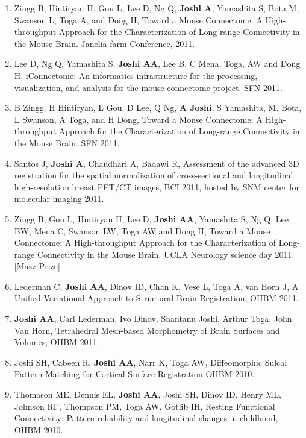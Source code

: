 \documentclass[overlapped,line,letterpaper]{res}
\begin{document}
\begin{resume}
\begin{enumerate}
    \item Zingg B, Hintiryan H, Gou L, Lee D, Ng Q, \textbf{Joshi A}, Yamashita S, Bota M, Swanson L, Toga A, and Dong H, {Toward a Mouse Connectome: A High-throughput Approach for the Characterization of Long-range Connectivity in the Mouse Brain}. Janelia farm Conference, 2011.

    \item Lee D, Ng Q, Yamashita S, \textbf{Joshi AA}, Lee B, C Mena, Toga, AW and Dong H, {iConnectome: An informatics infrastructure for the processing, visualization, and analysis for the mouse connectome project}. SFN 2011.

    \item B Zingg, H Hintiryan, L Gou, D Lee, Q Ng, \textbf{A Joshi}, S Yamashita, M. Bota, L Swanson, A Toga, and H Dong, {Toward a Mouse Connectome: A High-throughput Approach for the Characterization of Long-range Connectivity in the Mouse Brain}. SFN 2011.

    \item Santos J, \textbf{Joshi A}, Chaudhari A, Badawi R, {Assessment of the advanced 3D registration for the spatial normalization of cross-sectional and longitudinal high-resolution breast PET/CT images}, BCI 2011, hosted by SNM center for molecular imaging  2011.

    \item Zingg B, Gou L, Hintiryan H, Lee D, \textbf{Joshi AA}, Yamashita S, Ng Q, Lee BW, Mena C, Swanson LW, Toga AW and Dong H, {Toward a Mouse Connectome: A High-throughput Approach for the Characterization of Long-range Connectivity in the Mouse Brain}. UCLA Neurology science day 2011. [Mazz Prize]

    \item Lederman C, \textbf{Joshi AA}, Dinov ID, Chan K, Vese L, Toga A, van Horn J, {A Unified Variational Approach to Structural Brain Registration}, OHBM 2011.

    \item \textbf{Joshi AA}, Carl Lederman, Ivo Dinov, Shantanu Joshi, Arthur Toga, John Van Horn, {Tetrahedral Mesh-based Morphometry of Brain Surfaces and Volumes}, OHBM 2011.


    \item Joshi SH, Cabeen R, \textbf{Joshi AA}, Narr K, Toga AW, Diffeomorphic Sulcal Pattern Matching for Cortical Surface Registration OHBM 2010.

    \item Thomason ME, Dennis EL, \textbf{Joshi AA}, Joshi SH, Dinov ID, Henry ML, Johnson RF, Thompson PM, Toga AW, Gotlib IH, Resting Functional Connectivity: Pattern reliability and longitudinal changes in childhood, OHBM 2010.


\end{enumerate}
\end{resume}
\end{document}
